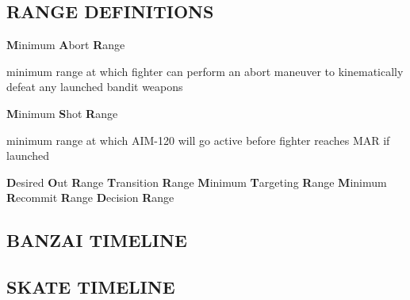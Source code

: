 \subsection{RANGE DEFINITIONS}

\begin{tcoloritemize}
    \blueitem[WEZ]
    \blueitem[MAR] \textbf{M}inimum \textbf{A}bort \textbf{R}ange

    \medskip
    minimum range at which fighter can perform an abort maneuver to kinematically defeat any launched bandit weapons 

    \blueitem[MSR] \textbf{M}inimum \textbf{S}hot \textbf{R}ange

    \medskip
    minimum range at which AIM-120 will go active before fighter reaches MAR if launched

    \blueitem[DOR] \textbf{D}esired \textbf{O}ut \textbf{R}ange
    \blueitem[TR] \textbf{T}ransition \textbf{R}ange
    \blueitem[MTR] \textbf{M}inimum \textbf{T}argeting \textbf{R}ange
    \blueitem[MRR] \textbf{M}inimum \textbf{R}ecommit \textbf{R}ange
    \blueitem[DR] \textbf{D}ecision \textbf{R}ange
\end{tcoloritemize}

\marginfigeometry

\subsection{BANZAI TIMELINE}
\label{subsec:ttpaa:timeline:banzai}

\clearpage

\subsection{SKATE TIMELINE}
\label{subsec:ttpaa:timeline:skate}

